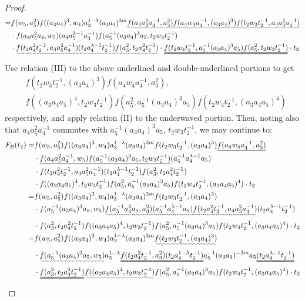 \documentclass[a4paper,10pt,reqno]{amsart}
\newcommand\FB{F_{\mathcal{B}}}
\begin{document}
\begin{proof}
\begin{align*}
=& f(w_5,a_5^2)f((a_3a_4)^3,w_4)
a_3^{1-\lambda}
(a_3a_4)^{3m}
\underline{
f(a_4a_3^2a_4^{-1},a_3^2)
f(a_4w_4a_4^{-1},(a_3a_4)^3)
f(t_2w_3t_2^{-1},a_4a_3^2a_4^{-1})}
\\
&\cdot
f(a_4a_5^2a_4,w_5)(a_4a_5^{\lambda-1}a_4^{-1})
f(a_5^{-1}(a_3a_4)^3a_5,t_2w_3t_2^{-1})\\
&\cdot
\uwave{
f(t_2a_4^2t_2^{-1},a_4a_5^2a_4^{-1})
(t_2a_4^{\lambda-1}t_2^{-1})
f(a_3^2,t_2a_4^2t_2^{-1})}\cdot
\uuline{
f(t_2w_4t_2^{-1},a_5^{-1}(a_3a_4)^3a_5)
f(a_5^2,t_2w_3t_2^{-1})
}\cdot t_2
\end{align*}
Use relation (III) to the above underlined and double-underlined portions to get
\begin{align*}
&f(t_2w_3t_2^{-1},(a_3a_4)^3)f(a_4w_4a_4^{-1},a_3^2), \\
&f((a_3a_4a_5)^4,t_2w_3t_2^{-1})
f(a_5^2,a_5^{-1}(a_3a_4)^3a_5)
f(t_2w_4t_2^{-1},(a_3a_4a_5)^4)
\end{align*}
respectively, and apply relation (II) to the underwaved 
portion. Then, noting also that $a_4a_5^2a_4^{-1}$
commutes with $a_5^{-1}(a_3a_4)^3a_5$, $t_2w_3t_2^{-1}$,
we may continue to:
\allowdisplaybreaks
\begin{align*}
\FB(t_2)=& f(w_5,a_5^2)f((a_3a_4)^3,w_4)
a_3^{1-\lambda}
(a_3a_4)^{3m}
f(t_2w_3t_2^{-1},(a_3a_4)^3)
\underline{f(a_4w_4a_4^{-1},a_3^2)}
\\
&\cdot
\underline{
f(a_4a_5^2a_4^{-1},w_5)f(a_5^{-1}(a_3a_4)^3a_5, t_2w_3t_2^{-1})}
(a_5^{-1}a_4^{\lambda-1}a_5) \\
&\cdot
f(t_2a_4^2t_2^{-1},a_4a_5^2a_4^{-1})
(t_2a_4^{\lambda-1}t_2^{-1})
f(a_3^2,t_2a_4^2t_2^{-1})\\
&\cdot
f((a_3a_4a_5)^4,t_2w_3t_2^{-1})
f(a_5^2,a_5^{-1}(a_3a_4)^3a_5)
f(t_2w_4t_2^{-1},(a_3a_4a_5)^4)
\cdot t_2 \\
=&
f(w_5,a_5^2)f((a_3a_4)^3,w_4)
a_3^{1-\lambda}
(a_3a_4)^{3m}
f(t_2w_3t_2^{-1},(a_3a_4)^3) \\
&\cdot
f(a_5^{-1}(a_3a_4)^3a_5,w_5)
\uwave{f(a_5^{-1}a_4^2a_5,a_3^2)
(a_5^{-1}a_4^{\lambda-1}a_5)
f(t_2a_4^2t_2^{-1},a_4a_5^2a_4^{-1})}
(t_2a_4^{\lambda-1}t_2^{-1})
\\
&\cdot
f(a_3^2,t_2a_4^2t_2^{-1})
f((a_3a_4a_5)^4,t_2w_3t_2^{-1})
f(a_5^2,a_5^{-1}(a_3a_4)^3a_5)
f(t_2w_4t_2^{-1},(a_3a_4a_5)^4)
\cdot t_2 \\
=&
f(w_5,a_5^2)f((a_3a_4)^3,w_4)
a_3^{1-\lambda}
(a_3a_4)^{3m}
\uwave{f(t_2w_3t_2^{-1},(a_3a_4)^3)} \\
&\cdot
\uwave{f(a_5^{-1}(a_3a_4)^3a_5,w_5)}
a_3^{1-\lambda}
\uuline{f(t_2a_4^2t_2^{-1},a_3^2)
(t_2a_4^{1-\lambda}t_2^{-1})}
a_5^{-1}(a_3a_4)^{-3m}a_5
\uuline{(t_2a_4^{\lambda-1}t_2^{-1})}
\\
&\cdot
\uuline{f(a_3^2,t_2a_4^2t_2^{-1})}
\uwave{f((a_3a_4a_5)^4,t_2w_3t_2^{-1})}
f(a_5^2,a_5^{-1}(a_3a_4)^3a_5)
f(t_2w_4t_2^{-1},(a_3a_4a_5)^4)
\cdot t_2 
\end{align*}


\end{proof}
\end{document}
